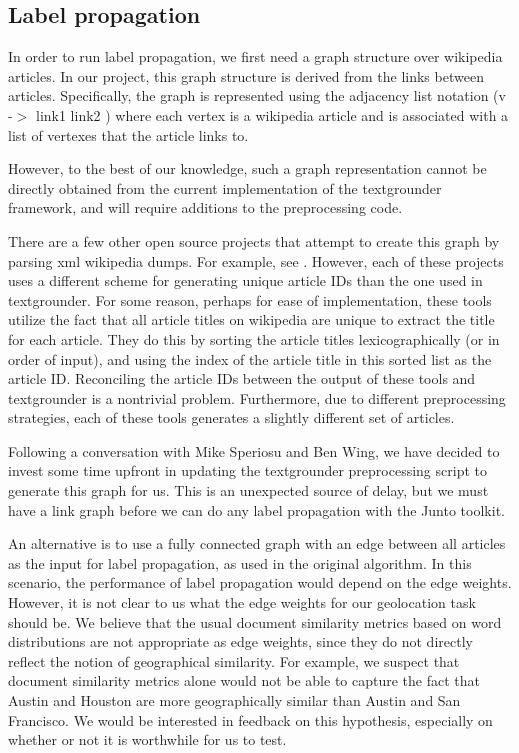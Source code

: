 \subsection{Label propagation}
In order to run label propagation, we first need a graph structure over
wikipedia articles. In our project, this graph structure is derived from the
links between articles. Specifically, the graph is represented using the
adjacency list notation (v -$>$ link1 link2 ) where each vertex is a wikipedia
article and is associated with a list of vertexes that the article links to.

However, to the best of our knowledge, such a graph representation cannot be
directly obtained from the current implementation of the textgrounder
framework, and will require additions to the preprocessing code.

There are a few other open source projects that attempt to create this graph by parsing xml wikipedia dumps.
For example, see \cite{} \cite{} \cite{}.
However, each of these projects uses a different scheme for generating unique article IDs than the one used in textgrounder.
For some reason, perhaps for ease of implementation, these tools utilize the fact that all article titles on wikipedia are unique to extract the title for each article.
They do this by sorting the article titles lexicographically (or in order of input), and using the index of the article title in this sorted list as the article ID.
Reconciling the article IDs between the output of these tools and textgrounder is a nontrivial problem.
Furthermore, due to different preprocessing strategies, each of these tools generates a slightly different set of articles.

Following a conversation with Mike Speriosu and Ben Wing, we have decided to
invest some time upfront in updating the textgrounder preprocessing script to
generate this graph for us.
This is an unexpected source of delay, but we must have
a link graph before we can do any label propagation with the Junto toolkit.

An alternative is to use a fully connected graph with an edge between all articles as the input for label propagation, as used in the original algorithm.
In this scenario, the performance of label propagation would depend on the edge weights.
However, it is not clear to us what the edge weights for our geolocation task should be.
We believe that the usual document similarity metrics based on word
distributions are not appropriate as edge weights, since they do not directly
reflect the notion of geographical similarity.
For example, we suspect that document similarity metrics alone would not be
able to capture the fact that Austin and Houston are more geographically
similar than Austin and San Francisco.
We would be interested in feedback on this hypothesis, especially on whether or
not it is worthwhile for us to test.
